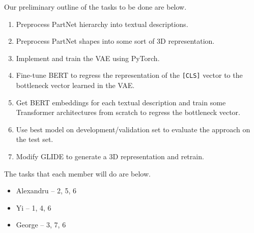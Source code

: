 \documentclass[11pt]{article}
\begin{document}


Our preliminary outline of the tasks to be done are below.

\begin{enumerate}
    \item Preprocess PartNet hierarchy into textual descriptions.
    \item Preprocess PartNet shapes into some sort of 3D representation.
    \item Implement and train the VAE using PyTorch.
    \item Fine-tune BERT to regress the representation of the \verb|[CLS]| vector to the bottleneck vector learned in the VAE.
    \item Get BERT embeddings for each textual description and train some Transformer architectures from scratch to regress the bottleneck vector.
    \item Use best model on development/validation set to evaluate the approach on the test set.
    \item Modify GLIDE to generate a 3D representation and retrain.
\end{enumerate}

The tasks that each member will do are below.

\begin{itemize}
    \item Alexandru -- 2, 5, 6
    \item Yi -- 1, 4, 6
    \item George -- 3, 7, 6
\end{itemize}

\small

\end{document}
